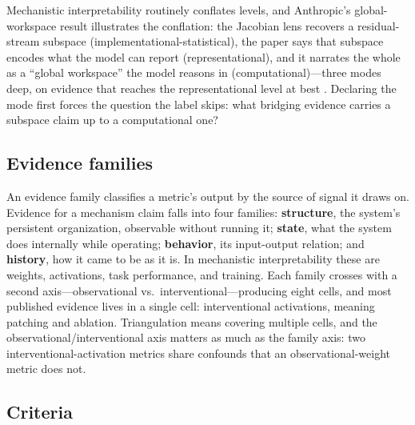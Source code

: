 \documentclass{article}
\begin{document}
Mechanistic interpretability routinely conflates levels, and Anthropic's global-workspace result illustrates the conflation: the Jacobian lens recovers a residual-stream subspace (implementational-statistical), the paper says that subspace encodes what the model can report (representational), and it narrates the whole as a ``global workspace'' the model reasons in (computational)---three modes deep, on evidence that reaches the representational level at best \citep{gurnee2026verbalizable}. Declaring the mode first forces the question the label skips: what bridging evidence carries a subspace claim up to a computational one?

\subsection{Evidence families}
\label{sec:evidence-families}

An evidence family classifies a metric's output by the source of signal it draws on. Evidence for a mechanism claim falls into four families: \textbf{structure}, the system's persistent organization, observable without running it; \textbf{state}, what the system does internally while operating; \textbf{behavior}, its input-output relation; and \textbf{history}, how it came to be as it is. In mechanistic interpretability these are weights, activations, task performance, and training. Each family crosses with a second axis---observational vs.\ interventional---producing eight cells, and most published evidence lives in a single cell: interventional activations, meaning patching and ablation. Triangulation means covering multiple cells, and the observational/interventional axis matters as much as the family axis: two interventional-activation metrics share confounds that an observational-weight metric does not.

\subsection{Criteria}
\label{sec:criteria}
\end{document}
